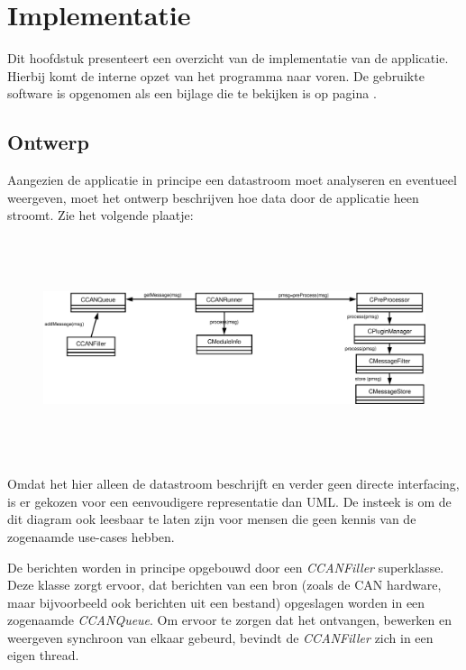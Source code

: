 \chapter{Implementatie}

Dit hoofdstuk presenteert een overzicht van de implementatie van de applicatie. Hierbij komt de interne opzet van het programma naar voren. De gebruikte software is opgenomen als een bijlage die te bekijken is op pagina \pageref{software}.

\begin{landscape}

\section{Ontwerp}
\label{ontwerp}

Aangezien de applicatie in principe een datastroom moet analyseren en eventueel weergeven, moet het ontwerp beschrijven hoe data door de applicatie heen stroomt. Zie het volgende plaatje:

\begin{figure}[h]
\includegraphics[width=18cm,height=6.5cm]{dataflow}
\end{figure}

Omdat het hier alleen de datastroom beschrijft en verder geen directe interfacing, is er gekozen voor een eenvoudigere representatie dan UML. De insteek is om de dit diagram ook leesbaar te laten zijn voor mensen die geen kennis van de zogenaamde use-cases hebben.

\end{landscape}

De berichten worden in principe opgebouwd door een \emph{CCANFiller} superklasse. Deze klasse zorgt ervoor, dat berichten van een bron (zoals de CAN hardware, maar bijvoorbeeld ook berichten uit een bestand) opgeslagen worden in een zogenaamde \emph{CCANQueue}. Om ervoor te zorgen dat het ontvangen, bewerken en weergeven synchroon van elkaar gebeurd, bevindt de \emph{CCANFiller} zich in een eigen thread.

